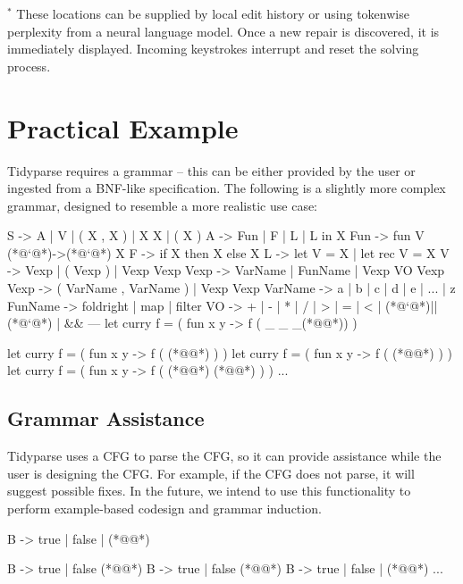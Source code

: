 \documentclass[sigplan,review,anonymous,acmsmall]{acmart}\settopmatter{printfolios=false,printccs=false,printacmref=false}
\begin{document}
    \noindent $^*$ These locations can be supplied by local edit history or using tokenwise perplexity from a neural language model. Once a new repair is discovered, it is immediately displayed. Incoming keystrokes interrupt and reset the solving process.

    \section{Practical Example}

    Tidyparse requires a grammar -- this can be either provided by the user or ingested from a BNF-like specification. The following is a slightly more complex grammar, designed to resemble a more realistic use case:

\begin{tidyinput}
S -> A | V | ( X , X ) | X X | ( X )
A -> Fun | F | L | L in X
Fun -> fun V (*@`@*)->(*@`@*) X
F -> if X then X else X
L -> let V = X | let rec V = X
V -> Vexp | ( Vexp ) | Vexp Vexp
Vexp -> VarName | FunName | Vexp VO Vexp
Vexp -> ( VarName , VarName ) | Vexp Vexp
VarName -> a | b | c | d | e | ... | z
FunName -> foldright | map | filter
VO ->  + | - | * | / | > | = | < | (*@`@*)||(*@`@*) | &&
---
let curry f = ( fun x y -> f ( _ _ _(*@\caret{ }@*)) )
\end{tidyinput}
\begin{tidyoutput}
let curry f = ( fun x y -> f ( (*@@*) ) )
let curry f = ( fun x y -> f ( (*@@*) ) )
let curry f = ( fun x y -> f ( (*@@*) (*@@*) ) )
...
\end{tidyoutput}

    \subsection{Grammar Assistance}

    Tidyparse uses a CFG to parse the CFG, so it can provide assistance while the user is designing the CFG. For example, if the CFG does not parse, it will suggest possible fixes. In the future, we intend to use this functionality to perform example-based codesign and grammar induction.

\begin{tidyinput}
B -> true | false | (*@\caret{ }@*)
\end{tidyinput}
\begin{tidyoutput}
B -> true | false (*@\hlred{ }@*)
B -> true | false (*@@*)
B -> true | false | (*@@*)
...
\end{tidyoutput}
\end{document}

